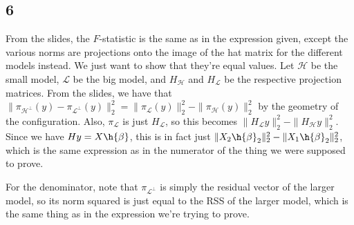 \documentclass{article}
\begin{document}
\subsection*{6}
From the slides, the $F$-statistic is the same as in the expression given, except the various norms are projections onto the image of the hat matrix for the different models instead. We just want to show that they're equal values. Let $\mathscr{H}$ be the small model, $\mathscr{L}$ be the big model, and $H_\mathscr{H}$ and $H_\mathscr{L}$ be the respective projection matrices. From the slides, we have that $\|\pi_{\mathscr{H}^\perp}(y)-\pi_{\mathscr{L}^\perp}(y)\|_2^2=\|\pi_\mathscr{L}(y)\|_2^2-\|\pi_\mathscr{H}(y)\|_2^2$ by the geometry of the configuration. Also, $\pi_\mathscr{L}$ is just $H_\mathscr{L}$, so this becomes $\|H_\mathscr{L}y\|_2^2-\|H_\mathscr{H}y\|_2^2$. Since we have $Hy=X\h{\beta}$, this is in fact just $\|X_2\h{\beta}_2\|_2^2-\|X_1\h{\beta}_2\|_2^2$, which is the same expression as in the numerator of the thing we were supposed to prove.

For the denominator, note that $\pi_{\mathscr{L}^\perp}$ is simply the residual vector of the larger model, so its norm squared is just equal to the RSS of the larger model, which is the same thing as in the expression we're trying to prove.
\end{document}
